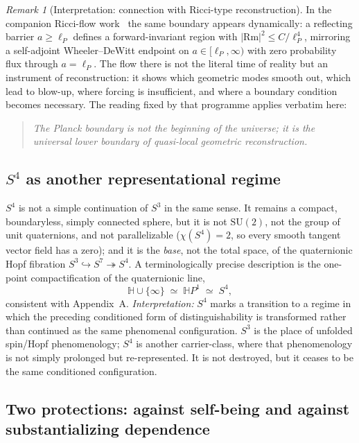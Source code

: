 \documentclass[11pt,a4paper]{article}
\theoremstyle{definition}
\theoremstyle{remark}
\newtheorem{remark}[theorem]{Remark}
\newcommand{\Sthree}{S^{3}}
\newcommand{\Sfour}{S^{4}}
\newcommand{\Sseven}{S^{7}}
\newcommand{\HP}{\mathbb{H}P}
\newcommand{\Hbb}{\mathbb{H}}
\newcommand{\SU}{\mathrm{SU}}
\begin{document}
\begin{remark}[Interpretation: connection with Ricci-type reconstruction]
In the companion Ricci-flow work~\cite{BateninPreece2026} the same boundary appears
dynamically: a reflecting barrier $a\ge\ell_{P}$ defines a forward-invariant region with
$|\mathrm{Rm}|^{2}\le C/\ell_{P}^{4}$, mirroring a self-adjoint Wheeler--DeWitt endpoint on
$a\in[\ell_{P},\infty)$ with zero probability flux through $a=\ell_{P}$.  The flow there is not
the literal time of reality but an instrument of reconstruction: it shows which geometric modes
smooth out, which lead to blow-up, where forcing is insufficient, and where a boundary condition
becomes necessary.  The reading fixed by that programme applies verbatim here:
\begin{quote}
\emph{The Planck boundary is not the beginning of the universe; it is the universal lower
boundary of quasi-local geometric reconstruction.}
\end{quote}
\end{remark}

\subsection{\texorpdfstring{$\Sfour$}{S4} as another representational regime}

$\Sfour$ is not a simple continuation of $\Sthree$ in the same sense.  It remains a compact,
boundaryless, simply connected sphere, but it is not $\SU(2)$, not the group of unit
quaternions, and not parallelizable ($\chi(\Sfour)=2$, so every smooth tangent vector field has
a zero); and it is the \emph{base}, not the total space, of the quaternionic Hopf fibration
$\Sthree\hookrightarrow\Sseven\twoheadrightarrow\Sfour$.  A terminologically precise description
is the one-point compactification of the quaternionic line,
\begin{equation}
\Hbb\cup\{\infty\}\;\simeq\;\HP^{1}\;\simeq\;\Sfour ,
\end{equation}
consistent with Appendix~A.  \emph{Interpretation:} $\Sfour$ marks a transition to a regime in
which the preceding conditioned form of distinguishability is transformed rather than continued
as the same phenomenal configuration.  $\Sthree$ is the place of unfolded spin/Hopf
phenomenology; $\Sfour$ is another carrier-class, where that phenomenology is not simply
prolonged but re-represented.  It is not destroyed, but it ceases to be the same conditioned
configuration.

\subsection{Two protections: against self-being and against substantializing dependence}
\end{document}
